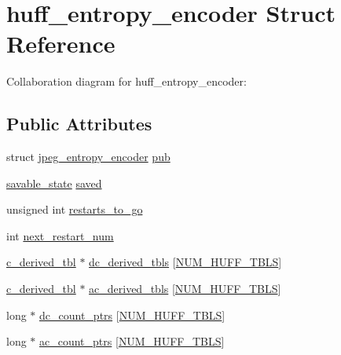 \hypertarget{structhuff__entropy__encoder}{}\section{huff\+\_\+entropy\+\_\+encoder Struct Reference}
\label{structhuff__entropy__encoder}


Collaboration diagram for huff\+\_\+entropy\+\_\+encoder\+:
\subsection*{Public Attributes}
\begin{DoxyCompactItemize}
\item 
struct \mbox{\hyperlink{structjpeg__entropy__encoder}{jpeg\+\_\+entropy\+\_\+encoder}} \mbox{\hyperlink{structhuff__entropy__encoder_a1a7606509ffbd9efd4c611af433879e0}{pub}}
\item 
\mbox{\hyperlink{structsavable__state}{savable\+\_\+state}} \mbox{\hyperlink{structhuff__entropy__encoder_ac27e136d5c3baca34bafde2053d91ad0}{saved}}
\item 
unsigned int \mbox{\hyperlink{structhuff__entropy__encoder_a6c999079a14022f2610081d420c36513}{restarts\+\_\+to\+\_\+go}}
\item 
int \mbox{\hyperlink{structhuff__entropy__encoder_ad6a426b0d41e9d06359bcc57481c891b}{next\+\_\+restart\+\_\+num}}
\item 
\mbox{\hyperlink{structc__derived__tbl}{c\+\_\+derived\+\_\+tbl}} $\ast$ \mbox{\hyperlink{structhuff__entropy__encoder_a6264cf74944972824cea6639229bdebe}{dc\+\_\+derived\+\_\+tbls}} \mbox{[}\mbox{\hyperlink{jpeglib_8h_a6b12985705944e0623b671f29dc5722e}{N\+U\+M\+\_\+\+H\+U\+F\+F\+\_\+\+T\+B\+LS}}\mbox{]}
\item 
\mbox{\hyperlink{structc__derived__tbl}{c\+\_\+derived\+\_\+tbl}} $\ast$ \mbox{\hyperlink{structhuff__entropy__encoder_a0b67beb3a73da24b5d09693f3c0c8b22}{ac\+\_\+derived\+\_\+tbls}} \mbox{[}\mbox{\hyperlink{jpeglib_8h_a6b12985705944e0623b671f29dc5722e}{N\+U\+M\+\_\+\+H\+U\+F\+F\+\_\+\+T\+B\+LS}}\mbox{]}
\item 
long $\ast$ \mbox{\hyperlink{structhuff__entropy__encoder_aee66f11440e615c95b333d71d3613513}{dc\+\_\+count\+\_\+ptrs}} \mbox{[}\mbox{\hyperlink{jpeglib_8h_a6b12985705944e0623b671f29dc5722e}{N\+U\+M\+\_\+\+H\+U\+F\+F\+\_\+\+T\+B\+LS}}\mbox{]}
\item 
long $\ast$ \mbox{\hyperlink{structhuff__entropy__encoder_acc141b7e17ee817d92b9340d603dde9e}{ac\+\_\+count\+\_\+ptrs}} \mbox{[}\mbox{\hyperlink{jpeglib_8h_a6b12985705944e0623b671f29dc5722e}{N\+U\+M\+\_\+\+H\+U\+F\+F\+\_\+\+T\+B\+LS}}\mbox{]}

\end{DoxyCompactItemize}
